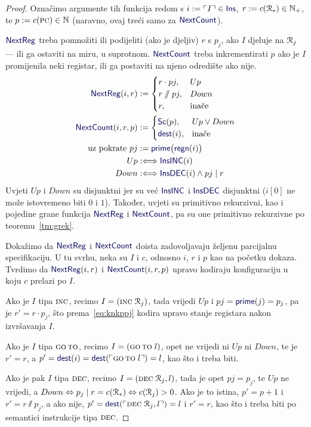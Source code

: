 \begin{proof}
Označimo argumente tih funkcija redom s $i:=\kins{I}\in\f{Ins}$, $r:=c(\mathcal R_{*})\in{\mathbb N}_+$, te $p:=c(\textsc{pc})\in{\mathbb N}$ (naravno, ovaj treći samo za $\f{NextCount}$).

$\f{NextReg}$ treba pomnožiti ili podijeliti (ako je djeljiv) $r$ s $p_j$, ako $I$ djeluje na $\mathcal R_{j}$ --- ili ga ostaviti na miru, u suprotnom. $\f{NextCount}$ treba inkrementirati $p$ ako je $I$ promijenila neki registar, ili ga postaviti na njeno odredište ako nije.
\begin{align}
    \label{eq:NextRegdef}\f{NextReg}(i,r)&:=\begin{cases}
    r\cdot pj,&Up\\
    r\sslash pj,&Down\\
    r,&\text{inače}
    \end{cases}%
\\
    \f{NextCount}(i,r,p)&:=\begin{cases}
    \f{Sc}(p),&Up\lor Down\\
    \f{dest}(i),&\text{inače}
    \end{cases}%
\\
\text{uz pokrate }
pj&:=\f{prime}\bigl(\f{regn}(i)\bigr)%
\\
Up&:\Longleftrightarrow\f{InsINC}(i)%
\\
Down&:\Longleftrightarrow\f{InsDEC}(i)\land pj\mid r%
\end{align}
Uvjeti $Up$ i $Down$ su disjunktni jer su već $\f{InsINC}$ i $\f{InsDEC}$ disjunktni ($i[0]$ ne može istovremeno biti $0$ i $1$). Također, uvjeti su primitivno rekurzivni, kao i pojedine grane funkcija $\f{NextReg}$ i $\f{NextCount}$, pa su one primitivno rekurzivne po teoremu~\ref{tm:grek}.

Dokažimo da $\f{NextReg}$ i $\f{NextCount}$ doista zadovoljavaju željenu parcijalnu specifikaciju. U tu svrhu, neka su $I$ i $c$, odnosno $i$, $r$ i $p$ kao na početku dokaza. Tvrdimo da $\f{NextReg}(i,r)$ i $\f{NextCount}(i,r,p)$ upravo kodiraju konfiguraciju u koju $c$ prelazi po $I$.

Ako je $I$ tipa $\textsc{inc}$, recimo $I=(\textsc{inc}\;\mathcal R_{j})$, tada vrijedi $Up$ i $pj=\f{prime}(j)=p_j$, pa je $r'=r\cdot p_j$, što prema~\eqref{eq:knkppj} kodira upravo stanje registara nakon izvršavanja $I$.

Ako je $I$ tipa $\textsc{go\,to}$, recimo $I=(\textsc{go\,to}\;l)$, opet ne vrijedi ni $Up$ ni $Down$, te je $r'=r$, a $p'=\f{dest}(i)=\f{dest}(\kins{\goto\;l})=l$, kao što i treba biti.

Ako je pak $I$ tipa $\textsc{dec}$, recimo $I=(\textsc{dec}\;\mathcal R_{j},l)$, tada je opet $pj=p_j$, te $Up$ ne vrijedi, a $Down\Leftrightarrow p_j\mid r=c(\mathcal R_{*})\Leftrightarrow c(\mathcal R_{j})>0$. Ako je to istina, $p'=p+1$ i $r'=r\sslash p_j$, a ako nije, $p'=\f{dest}(\kins{\decr jl})=l$ i $r'=r$, kao što i treba biti po semantici instrukcije tipa $\textsc{dec}$.
\end{proof}

